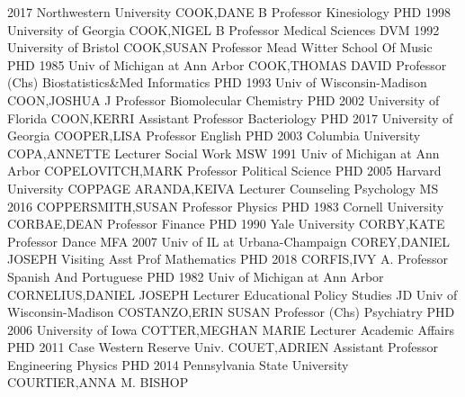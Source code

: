 \documentclass[
]{article}
\begin{document}
2017 Northwestern University \textbar COOK,DANE B \textbar{} 
\textbar Professor \textbar Kinesiology \textbar PHD 1998 University of
Georgia \textbar COOK,NIGEL B \textbar{}  \textbar Professor
\textbar Medical Sciences \textbar DVM 1992 University of Bristol
\textbar COOK,SUSAN \textbar{}  \textbar Professor
\textbar Mead Witter School Of Music \textbar PHD 1985 Univ of Michigan
at Ann Arbor \textbar COOK,THOMAS DAVID \textbar{} 
\textbar Professor (Chs) \textbar Biostatistics\&Med Informatics
\textbar PHD 1993 Univ of Wisconsin-Madison \textbar COON,JOSHUA J
\textbar{}  \textbar Professor \textbar Biomolecular
Chemistry \textbar PHD 2002 University of Florida \textbar COON,KERRI
\textbar{}  \textbar Assistant Professor
\textbar Bacteriology \textbar PHD 2017 University of Georgia
\textbar COOPER,LISA \textbar{}  \textbar Professor
\textbar English \textbar PHD 2003 Columbia University
\textbar COPA,ANNETTE \textbar{}  \textbar Lecturer
\textbar Social Work \textbar MSW 1991 Univ of Michigan at Ann Arbor
\textbar COPELOVITCH,MARK \textbar{}  \textbar Professor
\textbar Political Science \textbar PHD 2005 Harvard University
\textbar COPPAGE ARANDA,KEIVA \textbar{}  \textbar Lecturer
\textbar Counseling Psychology \textbar MS 2016
\textbar COPPERSMITH,SUSAN \textbar{}  \textbar Professor
\textbar Physics \textbar PHD 1983 Cornell University
\textbar CORBAE,DEAN \textbar{}  \textbar Professor
\textbar Finance \textbar PHD 1990 Yale University \textbar CORBY,KATE
\textbar{}  \textbar Professor \textbar Dance \textbar MFA
2007 Univ of IL at Urbana-Champaign \textbar COREY,DANIEL JOSEPH
\textbar{}  \textbar Visiting Asst Prof \textbar Mathematics
\textbar PHD 2018 \textbar CORFIS,IVY A. \textbar{} 
\textbar Professor \textbar Spanish And Portuguese \textbar PHD 1982
Univ of Michigan at Ann Arbor \textbar CORNELIUS,DANIEL JOSEPH
\textbar{}  \textbar Lecturer \textbar Educational Policy
Studies \textbar JD Univ of Wisconsin-Madison \textbar COSTANZO,ERIN
SUSAN \textbar{}  \textbar Professor (Chs)
\textbar Psychiatry \textbar PHD 2006 University of Iowa
\textbar COTTER,MEGHAN MARIE \textbar{}  \textbar Lecturer
\textbar Academic Affairs \textbar PHD 2011 Case Western Reserve Univ.
\textbar COUET,ADRIEN \textbar{}  \textbar Assistant
Professor \textbar Engineering Physics \textbar PHD 2014 Pennsylvania
State University \textbar COURTIER,ANNA M. BISHOP \textbar{} 
\end{document}
